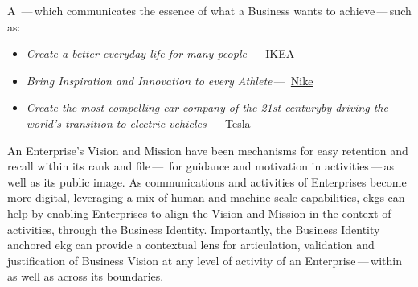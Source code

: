 A \textbf{}\,---\,which communicates the essence of what a Business wants to
achieve\,---\,such as:
\begin{itemize}
    \item \textit{Create a better everyday life for many people}\,---\,%
    \href{https://www.ikea.com/gb/en/this-is-ikea/about-us/vision-and-business-idea-pub9cd02291}{IKEA}
    \item \textit{Bring Inspiration and Innovation to every Athlete}\,---\,%
    \href{https://www.nike.com/gb/help/a/nikeinc-mission}{Nike}
    \item \textit{Create the most compelling car company of the 21st century\newline by driving the world's
    transition to electric vehicles}\,---\,%
    \href{https://visionarybusinessperson.com/tesla-mission-statement/}{Tesla}
\end{itemize}

An Enterprise’s Vision and Mission have been mechanisms for easy
retention and recall within its rank and file\,---\,%
for guidance and motivation in activities\,---\,as well as its public image.
As communications and activities of Enterprises become more digital, leveraging a mix of human and machine scale
capabilities, \glspl{ekg} can help by enabling Enterprises to align the Vision and Mission in the context of activities,
through the Business Identity.
Importantly, the Business Identity anchored \gls{ekg} can provide a contextual lens for articulation,
validation and justification of Business Vision at any level of activity of an Enterprise\,---\,within as well as
across its boundaries.
